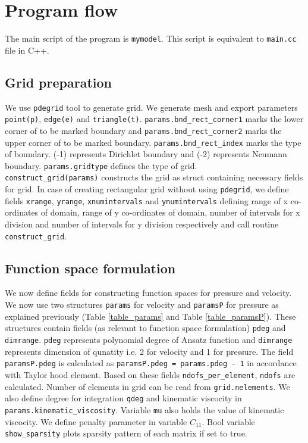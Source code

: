 \documentclass[a4paper,openany]{book}
\begin{document}
\section{Program flow}

The main script of the program is \verb|mymodel|. This script is equivalent to \verb|main.cc| file in C++.

\subsection{Grid preparation}

We use \verb|pdegrid| tool to generate grid. We generate mesh and export parameters \verb|point(p)|, \verb|edge(e)| and \verb|triangle(t)|. \verb|params.bnd_rect_corner1| marks the lower corner of to be marked boundary and \verb|params.bnd_rect_corner2| marks the upper corner of to be marked boundary. \verb|params.bnd_rect_index| marks the type of boundary. (-1) represents Dirichlet boundary and (-2) represents Neumann boundary. \verb|params.gridtype| defines the type of grid. \\

\verb|construct_grid(params)| constructs the grid as struct containing necessary fields for grid. In case of creating rectangular grid without using \verb|pdegrid|, we define fields \verb|xrange|, \verb|yrange|, \verb|xnumintervals| and \verb|ynumintervals| defining range of x co-ordinates of domain, range of y co-ordinates of domain, number of intervals for x division and number of intervals for y division respectively and call routine \verb|construct_grid|.

\subsection{Function space formulation}

We now define fields for constructing function spaces for pressure and velocity. We now use two structures \verb|params| for velocity and \verb|paramsP| for pressure as explained previously (Table \ref{table_params} and Table \ref{table_paramsP}). These structures contain fields (as relevant to function space formulation) \verb|pdeg| and \verb|dimrange|. \verb|pdeg| represents polynomial degree of Ansatz function and \verb|dimrange| represents  dimension of qunatity i.e. 2 for velocity and 1 for pressure. The field \verb|paramsP.pdeg| is calculated as \verb|paramsP.pdeg = params.pdeg - 1| in accordance with Taylor hood element. Based on these fields \verb|ndofs_per_element|, \verb|ndofs| are calculated. Number of elements in grid can be read from \verb|grid.nelements|. We also define degree for integration \verb|qdeg| and kinematic viscocity in \verb|params.kinematic_viscosity|. Variable \verb|mu| also holds the value of kinematic viscocity. We define penalty parameter in variable $C_{11}$. Bool variable \verb|show_sparsity| plots sparsity pattern of each matrix if set to true.\\
\end{document}

